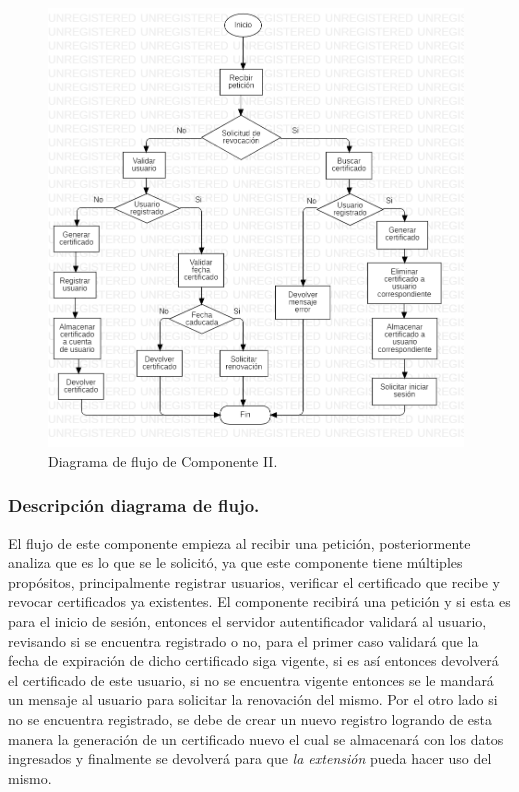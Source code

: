 \documentclass[12pt, a4paper, titlepage]{report}
\begin{document}
    		\begin{figure}[H]
            	\begin{center}	\includegraphics[width=11cm]{./imagenes/Disenio/Componente_2/CII_FD.png}
            	\caption{Diagrama de flujo de Componente II.}
            	\end{center}
    		\end{figure}
    		
    		\subsubsection{Descripción diagrama de flujo.}
    		El flujo de este componente empieza al recibir una petición, posteriormente analiza que es lo que se le solicitó, ya que este componente tiene múltiples propósitos, principalmente registrar usuarios, verificar el certificado que recibe y revocar certificados ya existentes. El componente recibirá una petición y si esta es para el inicio de sesión, entonces el servidor autentificador validará al usuario, revisando si se encuentra registrado o no, para el primer caso validará que la fecha de expiración de dicho certificado siga vigente, si es así entonces devolverá el certificado de este usuario, si no se encuentra vigente entonces se le mandará un mensaje al usuario para solicitar la renovación del mismo.    		Por el otro lado si no se encuentra registrado, se debe de crear un nuevo registro logrando de esta manera la generación de un certificado nuevo el cual se almacenará con los datos ingresados y finalmente se devolverá para que \textit{la extensión} pueda hacer uso del mismo. \\
    		
\end{document}
